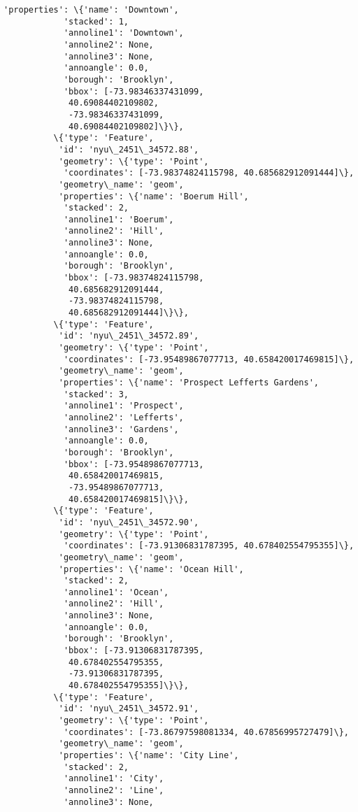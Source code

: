 \documentclass[11pt]{article}
\begin{document}
\begin{Verbatim}[commandchars=\\\{\}]
           'properties': \{'name': 'Downtown',
            'stacked': 1,
            'annoline1': 'Downtown',
            'annoline2': None,
            'annoline3': None,
            'annoangle': 0.0,
            'borough': 'Brooklyn',
            'bbox': [-73.98346337431099,
             40.69084402109802,
             -73.98346337431099,
             40.69084402109802]\}\},
          \{'type': 'Feature',
           'id': 'nyu\_2451\_34572.88',
           'geometry': \{'type': 'Point',
            'coordinates': [-73.98374824115798, 40.685682912091444]\},
           'geometry\_name': 'geom',
           'properties': \{'name': 'Boerum Hill',
            'stacked': 2,
            'annoline1': 'Boerum',
            'annoline2': 'Hill',
            'annoline3': None,
            'annoangle': 0.0,
            'borough': 'Brooklyn',
            'bbox': [-73.98374824115798,
             40.685682912091444,
             -73.98374824115798,
             40.685682912091444]\}\},
          \{'type': 'Feature',
           'id': 'nyu\_2451\_34572.89',
           'geometry': \{'type': 'Point',
            'coordinates': [-73.95489867077713, 40.658420017469815]\},
           'geometry\_name': 'geom',
           'properties': \{'name': 'Prospect Lefferts Gardens',
            'stacked': 3,
            'annoline1': 'Prospect',
            'annoline2': 'Lefferts',
            'annoline3': 'Gardens',
            'annoangle': 0.0,
            'borough': 'Brooklyn',
            'bbox': [-73.95489867077713,
             40.658420017469815,
             -73.95489867077713,
             40.658420017469815]\}\},
          \{'type': 'Feature',
           'id': 'nyu\_2451\_34572.90',
           'geometry': \{'type': 'Point',
            'coordinates': [-73.91306831787395, 40.678402554795355]\},
           'geometry\_name': 'geom',
           'properties': \{'name': 'Ocean Hill',
            'stacked': 2,
            'annoline1': 'Ocean',
            'annoline2': 'Hill',
            'annoline3': None,
            'annoangle': 0.0,
            'borough': 'Brooklyn',
            'bbox': [-73.91306831787395,
             40.678402554795355,
             -73.91306831787395,
             40.678402554795355]\}\},
          \{'type': 'Feature',
           'id': 'nyu\_2451\_34572.91',
           'geometry': \{'type': 'Point',
            'coordinates': [-73.86797598081334, 40.67856995727479]\},
           'geometry\_name': 'geom',
           'properties': \{'name': 'City Line',
            'stacked': 2,
            'annoline1': 'City',
            'annoline2': 'Line',
            'annoline3': None,

\end{Verbatim}
\end{document}
